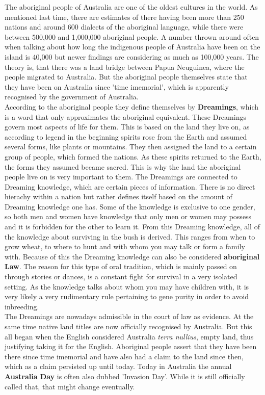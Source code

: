\documentclass{article}
\begin{document}
	The aboriginal people of Australia are one of the oldest cultures in the world. As mentioned last time, there are estimates of there having been more than 250 nations and around 600 dialects of the aboriginal language, while there were between 500,000 and 1,000,000 aboriginal people. A number thrown around often when talking about how long the indigenous people of Australia have been on the island is 40,000 but newer findings are considering as much as 100,000 years. The theory is, that there was a land bridge between Papua Neuguinea, where the people migrated to Australia. But the aboriginal people themselves state that they have been on Australia since 'time imemorial', which is apparently recognised by the government of Australia. \\
	According to the aboriginal people they define themselves by \textbf{Dreamings}, which is a word that only approximates the aboriginal equivalent. These Dreamings govern most aspects of life for them. This is based on the land they live on, as according to legend in the beginning spirits rose from the Earth and assumed several forms, like plants or mountains. They then assigned the land to a certain group of people, which formed the nations. As these spirits returned to the Earth, the forms they assumed became sacred. This is why the land the aboriginal people live on is very important to them. The Dreamings are connected to Dreaming knowledge, which are certain pieces of information. There is no direct hierachy within a nation but rather defines itself based on the amount of Dreaming knowledge one has. Some of the knowledge is exclusive to one gender, so both men and women have knowledge that only men or women may possess and it is forbidden for the other to learn it. From this Dreaming knowledge, all of the knowledge about surviving in the bush is derived. This ranges from when to grow wheat, to where to hunt and with whom you may talk or form a family with. Because of this the Dreaming knowledge can also be considered \textbf{aboriginal Law}. The reason for this type of oral tradition, which is mainly passed on through stories or dances, is a constant fight for survival in a very isolated setting. As the knowledge talks about whom you may have children with, it is very likely a very rudimentary rule pertaining to gene purity in order to avoid inbreeding. \\
	The Dreamings are nowadays admissible in the court of law as evidence. At the same time native land titles are now officially recognised by Australia. But this all began when the English considered Australia \textit{terra nullius}, empty land, thus justifying taking it for the English. Aboriginal people assert that they have been there since time imemorial and have also had a claim to the land since then, which as a claim persisted up until today. Today in Australia the annual \textbf{Australia Day} is often also dubbed 'Invasion Day'. While it is still officially called that, that might change eventually. \\
\end{document}
